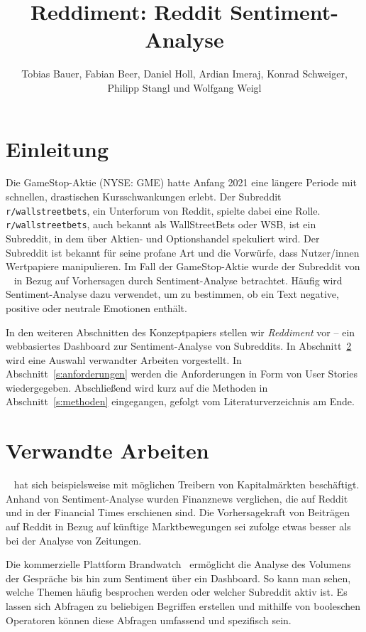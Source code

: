 \documentclass[a4paper, 10pt, conference]{ieeeconf}
\title{\LARGE \bf
Reddiment: Reddit Sentiment-Analyse
}
\author{Tobias Bauer, Fabian Beer,  Daniel Holl,  Ardian Imeraj,  Konrad Schweiger,  Philipp Stangl und Wolfgang Weigl
}
\begin{document}
\maketitle
\thispagestyle{empty}
\pagestyle{empty}

\section{Einleitung}

Die GameStop-Aktie (NYSE: GME) hatte Anfang 2021 eine längere Periode mit schnellen, drastischen Kursschwankungen erlebt. Der Subreddit \texttt{r/wallstreetbets}, ein Unterforum von Reddit, spielte dabei eine Rolle. \texttt{r/wallstreetbets}, auch bekannt als WallStreetBets oder WSB, ist ein Subreddit, in dem über Aktien- und Optionshandel spekuliert wird.  Der Subreddit ist bekannt für seine profane Art und die Vorwürfe, dass Nutzer/innen Wertpapiere manipulieren. Im Fall der GameStop-Aktie wurde der Subreddit von \citeauthor{wang2021}~\cite{wang2021} in Bezug auf Vorhersagen durch Sentiment-Analyse betrachtet. Häufig wird Sentiment-Analyse dazu verwendet, um zu bestimmen, ob ein Text negative, positive oder neutrale Emotionen enthält.

In den weiteren Abschnitten des Konzeptpapiers stellen wir \textit{Reddiment} vor -- ein webbasiertes Dashboard zur Sentiment-Analyse von Subreddits. In Abschnitt~\ref{s:verwandte_arbeiten} wird eine Auswahl verwandter Arbeiten vorgestellt. In Abschnitt~\ref{s:anforderungen} werden die Anforderungen in Form von User Stories wiedergegeben. Abschließend wird kurz auf die Methoden in Abschnitt~\ref{s:methoden} eingegangen, gefolgt vom Literaturverzeichnis am Ende.


\section{Verwandte Arbeiten} \label{s:verwandte_arbeiten}

\citeauthor{lubitz2017}~\cite{lubitz2017} hat sich beispielsweise mit möglichen Treibern von Kapitalmärkten beschäftigt. Anhand von Sentiment-Analyse wurden Finanznews verglichen, die auf Reddit und in der Financial Times erschienen sind. Die Vorhersagekraft von Beiträgen auf Reddit in Bezug auf künftige Marktbewegungen sei \citeauthor{lubitz2017} zufolge etwas besser als bei der Analyse von Zeitungen.

Die kommerzielle Plattform Brandwatch~\cite{brandwatch} ermöglicht die Analyse des Volumens der Gespräche bis hin zum Sentiment über ein Dashboard. So kann man sehen, welche Themen häufig besprochen werden oder welcher Subreddit aktiv ist. Es lassen sich Abfragen zu beliebigen Begriffen erstellen und mithilfe von booleschen Operatoren können diese Abfragen umfassend und spezifisch sein.
\end{document}
